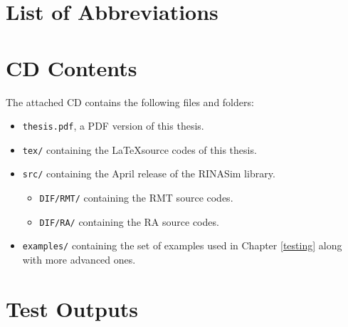 \chapter{List of Abbreviations}

\chapter{CD Contents}
    The attached CD contains the following files and folders:

    \begin{itemize}
        \item \texttt{thesis.pdf}, a PDF version of this thesis.
        \item \texttt{tex/} containing the \LaTeX source codes of this thesis.
        \item \texttt{src/} containing the April release of the RINASim library.
        \begin{itemize}
            \item \texttt{DIF/RMT/} containing the RMT source codes.
            \item \texttt{DIF/RA/} containing the RA source codes.
        \end{itemize}
        \item \texttt{examples/} containing the set of examples used in Chapter \ref{testing} along with more advanced ones.
    \end{itemize}

\chapter{Test Outputs}